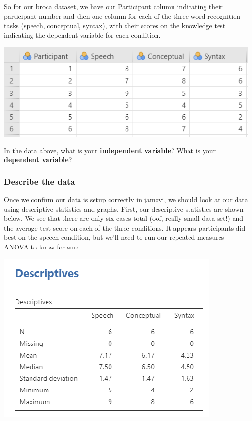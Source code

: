 \documentclass[
]{book}
\begin{document}
So for our broca dataset, we have our Participant column indicating their participant number and then one column for each of the three word recognition tasks (speech, conceptual, syntax), with their scores on the knowledge test indicating the dependent variable for each condition.

\includegraphics{images/05-repeated-measures-anova/rm_data.png}

In the data above, what is your \textbf{independent variable}? What is your \textbf{dependent variable}?

\hypertarget{describe-the-data-5}{%
\subsubsection{Describe the data}\label{describe-the-data-5}}

Once we confirm our data is setup correctly in jamovi, we should look at our data using descriptive statistics and graphs. First, our descriptive statistics are shown below. We see that there are only six cases total (oof, really small data set!) and the average test score on each of the three conditions. It appears participants did best on the speech condition, but we'll need to run our repeated measures ANOVA to know for sure.

\includegraphics{images/05-repeated-measures-anova/rm_descriptives.png}
\end{document}

